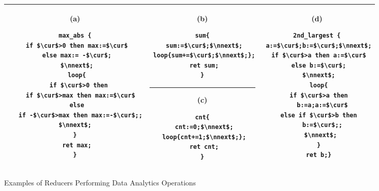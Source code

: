 \begin{figure}
	\centering
	\lstset{language=C,
		basicstyle=\ttfamily\scriptsize}
	\begin{tabular}{|c|c|c|}
		\hline
		\begin{minipage}[t]{0.39\textwidth}
			(a)
			\begin{lstlisting}[mathescape=true]
max_abs {
 if $\cur$>0 then max:=$\cur$
 else max:= -$\cur$;
 $\nnext$;
 loop{
  if $\cur$>0 then
   if $\cur$>max then max:=$\cur$
  else 
   if -$\cur$>max then max:=-$\cur$;;
  $\nnext$;  
 } 
 ret max;
}
	\end{lstlisting}
		\end{minipage}&
		\begin{minipage}[t]{0.27\textwidth}
			(b)
			\begin{lstlisting}[mathescape=true]
sum{
 sum:=$\cur$;$\nnext$;
 loop{sum+=$\cur$;$\nnext$;};
 ret sum;
}
			\end{lstlisting}
\hrule\vspace{0.1cm}			
			(c)
			\begin{lstlisting}[mathescape=true]
cnt{
 cnt:=0;$\nnext$;
 loop{cnt+=1;$\nnext$;};
 ret cnt;
}
			\end{lstlisting}			
		\end{minipage}&
		\begin{minipage}[t]{0.30\textwidth}
			(d) 
			\begin{lstlisting}[mathescape=true]
2nd_largest {
 a:=$\cur$;b:=$\cur$;$\nnext$;
 if $\cur$>a then a:=$\cur$
 else b:=$\cur$;
 $\nnext$;
 loop{
  if $\cur$>a then 
   b:=a;a:=$\cur$
  else if $\cur$>b then 
   b:=$\cur$;;
  $\nnext$;
 }
 ret b;}
			\end{lstlisting}		
		\end{minipage}\\
		\hline		
	\end{tabular}
	\caption{Examples of Reducers Performing Data Analytics Operations}
	\label{fig:examples}
\end{figure}